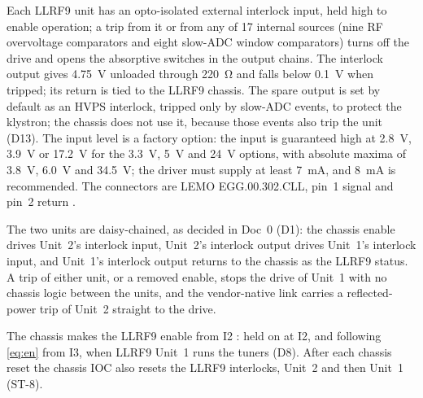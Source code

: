 Each LLRF9 unit has an opto-isolated external interlock input, held high to enable
operation; a trip from it or from any of 17 internal sources (nine RF overvoltage
comparators and eight slow-ADC window comparators) turns off the drive and opens the
absorptive switches in the output chains. The interlock output gives
\qty{4.75}{\volt} unloaded through \qty{220}{\ohm} and falls below \qty{0.1}{\volt}
when tripped; its return is tied to the LLRF9 chassis. The spare output is set by
default as an HVPS interlock, tripped only by slow-ADC events, to protect the klystron;
the chassis does not use it, because those events also trip the unit (D13).
The input level is a factory option: the input is guaranteed high at
\qty{2.8}{\volt}, \qty{3.9}{\volt} or \qty{17.2}{\volt} for the \qty{3.3}{\volt},
\qty{5}{\volt} and \qty{24}{\volt} options, with absolute maxima of \qty{3.8}{\volt},
\qty{6.0}{\volt} and \qty{34.5}{\volt}; the driver must supply at least
\qty{7}{\milli\ampere}, and \qty{8}{\milli\ampere} is recommended. The connectors are
LEMO EGG.00.302.CLL, pin~1 signal and pin~2 return .

The two units are daisy-chained, as decided in Doc~0  (D1): the chassis enable
drives Unit~2's interlock input, Unit~2's interlock output drives Unit~1's interlock
input, and Unit~1's interlock output returns to the chassis as the LLRF9 status. A trip
of either unit, or a removed enable, stops the drive of Unit~1 with no chassis logic
between the units, and the vendor-native link carries a reflected-power trip of Unit~2
straight to the drive.

The chassis makes the LLRF9 enable from I2 : held on at I2, and following
\cref{eq:en} from I3,
when LLRF9 Unit~1 runs the tuners (D8). After each chassis reset the chassis IOC also
resets the LLRF9 interlocks, Unit~2 and then Unit~1 (ST-8).

